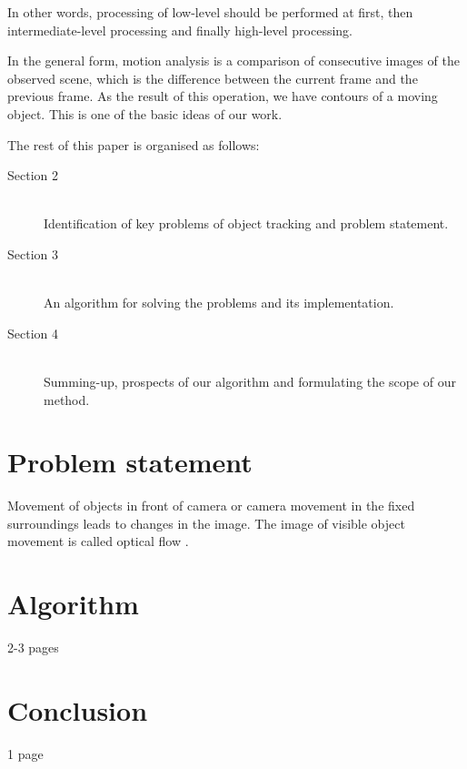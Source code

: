 \documentclass[12pt,a4paper,oneside,titlepage]{article}
\begin{document}
In other words, processing of low-level should be performed at first, then intermediate-level processing and finally high-level processing.

In the general form, motion analysis is a comparison of consecutive images of the observed scene, which is the difference between the current frame and the previous frame.
As the result of this operation, we have contours of a moving object.
This is one of the basic ideas of our work.

The rest of this paper is organised as follows:
\begin{description}
  \item[Section 2] \hfill \\
  Identification of key problems of object tracking and problem statement.
  \item[Section 3] \hfill \\
  An algorithm for solving the problems and its implementation. 
  \item[Section 4] \hfill \\
  Summing-up, prospects of our algorithm and formulating the scope of our method.
\end{description}

\newpage
\section*{Problem statement}
Movement of objects in front of camera or camera movement in the fixed surroundings leads to changes in the image.
The image of visible object movement is called optical flow \cite{opticalflow}.



\newpage
\section*{Algorithm}
2-3 pages



\newpage
\section*{Conclusion}
1 page


\newpage
\renewcommand\refname{Bibliography}


\end{document}

